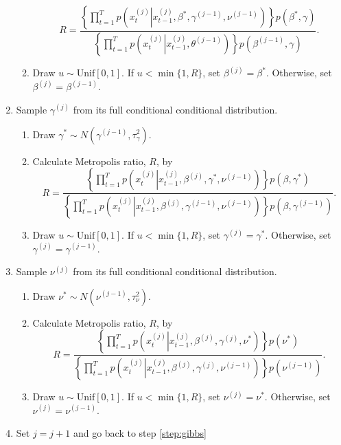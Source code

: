 \begin{enumerate}
\begin{enumerate}
    \[R = \frac{\left\{\prod_{t=1}^T p\left(x^{(j)}_t\left|x^{(j)}_{t-1},\beta^*,\gamma^{(j-1)},\nu^{(j-1)}\right.\right)\right\}p(\beta^*,\gamma)}{\left\{\prod_{t=1}^T p\left(x^{(j)}_t\left|x^{(j)}_{t-1},\theta^{(j-1)}\right.\right)\right\}p\left(\beta^{(j-1)},\gamma\right)}.\]
    \item Draw $u \sim \mbox{Unif}[0,1]$. If $u < \min\{1, R\}$, set $\beta^{(j)} = \beta^*$. Otherwise, set $\beta^{(j)} = \beta^{(j-1)}$.
    \end{enumerate}
\item \label{step:gamma} Sample $\gamma^{(j)}$ from its full conditional conditional distribution.
    \begin{enumerate}
    \item Draw $\gamma^* \sim N(\gamma^{(j-1)},\tau^2_{\gamma})$.
    \item Calculate Metropolis ratio, $R$, by
    \[R = \frac{\left\{\prod_{t=1}^T p\left(x^{(j)}_t\left|x^{(j)}_{t-1},\beta^{(j)},\gamma^*,\nu^{(j-1)}\right.\right)\right\}p(\beta, \gamma^*)}{\left\{\prod_{t=1}^T p\left(x^{(j)}_t\left|x^{(j)}_{t-1},\beta^{(j)},\gamma^{(j-1)},\nu^{(j-1)}\right.\right)\right\}p\left(\beta, \gamma^{(j-1)}\right)}.\]
    \item Draw $u \sim \mbox{Unif}[0,1]$. If $u < \min\{1, R\}$, set $\gamma^{(j)} = \gamma^*$. Otherwise, set $\gamma^{(j)} = \gamma^{(j-1)}$.
    \end{enumerate}
\item \label{step:nu} Sample $\nu^{(j)}$ from its full conditional conditional distribution.
    \begin{enumerate}
    \item Draw $\nu^* \sim N(\nu^{(j-1)},\tau^2_{\nu})$.
    \item Calculate Metropolis ratio, $R$, by
    \[R = \frac{\left\{\prod_{t=1}^T p\left(x^{(j)}_t\left|x^{(j)}_{t-1},\beta^{(j)},\gamma^{(j)},\nu^*\right.\right)\right\}p(\nu^*)}{\left\{\prod_{t=1}^T p\left(x^{(j)}_t\left|x^{(j)}_{t-1},\beta^{(j)},\gamma^{(j)},\nu^{(j-1)}\right.\right)\right\}p\left(\nu^{(j-1)}\right)}.\]
    \item Draw $u \sim \mbox{Unif}[0,1]$. If $u < \min\{1, R\}$, set $\nu^{(j)} = \nu^*$. Otherwise, set $\nu^{(j)} = \nu^{(j-1)}$.
    \end{enumerate}
\item Set $j = j + 1$ and go back to step \ref{step:gibbs}
\end{enumerate}
